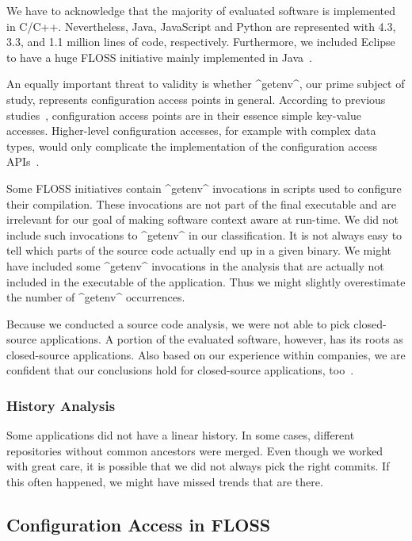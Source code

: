 We have to acknowledge that the majority of evaluated software is implemented in C/C++.
Nevertheless, Java, JavaScript and Python are represented with 4.3, 3.3, and 1.1 million lines of code, respectively.
Furthermore, we included Eclipse to have a huge FLOSS initiative mainly implemented in Java~\cite{raab2017introducing}.

An equally important threat to validity is whether ^getenv^, our prime subject of study, represents configuration access points in general.
According to previous studies~\cite{jin2014configurations,rabkin2011static,xu2013blame}, configuration access points are in their essence simple key-value accesses.
Higher-level configuration accesses, for example with complex data types, would only complicate the implementation of the configuration access APIs~\cite{behrang2015users,raab2017introducing}.

Some FLOSS initiatives contain ^getenv^ invocations in scripts used to configure their compilation.
These invocations are not part of the final executable and are irrelevant for our goal of making software context aware at run-time.
We did not include such invocations to ^getenv^ in our classification.
It is not always easy to tell which parts of the source code actually end up in a given binary.
We might have included some ^getenv^ invocations in the analysis that are actually not included in the executable of the application.
Thus we might slightly overestimate the number of ^getenv^ occurrences.

Because we conducted a source code analysis, we were not able to pick closed-source applications.
A portion of the evaluated software, however, has its roots as closed-source applications.
Also based on our experience within companies, we are confident that our conclusions hold for closed-source applications, too~\cite{raab2017introducing}.


\subsubsection{History Analysis}

Some applications did not have a linear history.
In some cases, different repositories without common ancestors were merged.
Even though we worked with great care, it is possible that we did not always pick the right commits.
If this often happened, we might have missed trends that are there.


\subsection{Configuration Access in FLOSS}

